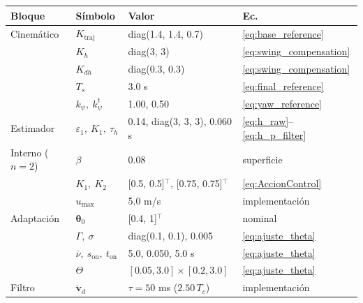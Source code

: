 \begin{tabular}{llll}
\toprule
Bloque & S\'imbolo & Valor & Ec. \\
\midrule
Cinem\'atico & $K_{\mathrm{traj}}$ & diag(1.4, 1.4, 0.7) & \eqref{eq:base_reference} \\
 & $K_h$ & diag(3, 3) & \eqref{eq:swing_compensation} \\
 & $K_{dh}$ & diag(0.3, 0.3) & \eqref{eq:swing_compensation} \\
 & $T_s$ & 3.0 s & \eqref{eq:final_reference} \\
 & $k_\psi,\ k_\psi^t$ & 1.00, 0.50 & \eqref{eq:yaw_reference} \\
Estimador & $\varepsilon_1,\ K_1,\ \tau_h$ & 0.14, diag(3, 3, 3), 0.060 s & \eqref{eq:h_raw}--\eqref{eq:h_p_filter} \\
Interno ($n=2$) & $\beta$ & 0.08 & superficie \\
 & $K_1,\ K_2$ & [0.5, 0.5]$^\top$, [0.75, 0.75]$^\top$ & \eqref{eq:AccionControl} \\
 & $u_{\max}$ & 5.0 m/s & implementaci\'on \\
Adaptaci\'on & $\boldsymbol{\theta}_0$ & [0.4, 1]$^\top$ & nominal \\
 & $\Gamma,\ \sigma$ & diag(0.1, 0.1), 0.005 & \eqref{eq:ajuste_theta} \\
 & $\bar\nu,\ s_{\mathrm{on}},\ t_{\mathrm{on}}$ & 5.0, 0.050, 5.0 s & \eqref{eq:ajuste_theta} \\
 & $\Theta$ & $[0.05,3.0]\times[0.2,3.0]$ & \eqref{eq:ajuste_theta} \\
Filtro & $\dot{\mathbf{v}}_d$ & $\tau = 50$ ms ($2.50\,T_c$) & implementaci\'on \\
\bottomrule
\end{tabular}
